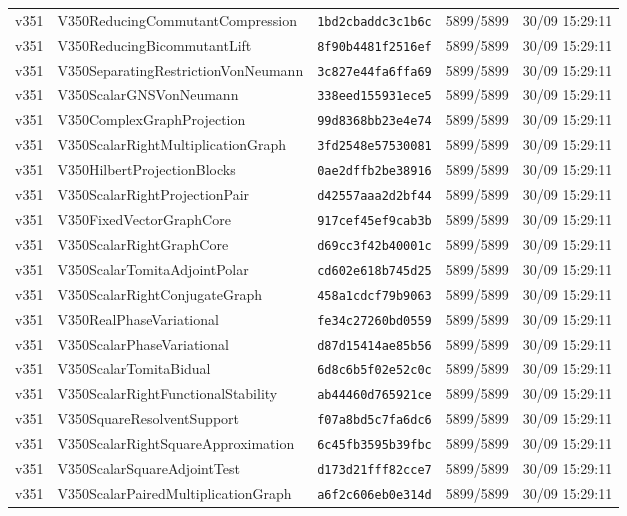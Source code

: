 \documentclass[11pt]{article}
\theoremstyle{definition}\newtheorem{deriv}{Derivation}
\begin{document}
{\begin{longtable}{@{}lllll@{}}
v351 & V350ReducingCommutantCompression & \texttt{1bd2cbaddc3c1b6c} & 5899/5899 & 30/09 15:29:11 \\
v351 & V350ReducingBicommutantLift & \texttt{8f90b4481f2516ef} & 5899/5899 & 30/09 15:29:11 \\
v351 & V350SeparatingRestrictionVonNeumann & \texttt{3c827e44fa6ffa69} & 5899/5899 & 30/09 15:29:11 \\
v351 & V350ScalarGNSVonNeumann & \texttt{338eed155931ece5} & 5899/5899 & 30/09 15:29:11 \\
v351 & V350ComplexGraphProjection & \texttt{99d8368bb23e4e74} & 5899/5899 & 30/09 15:29:11 \\
v351 & V350ScalarRightMultiplicationGraph & \texttt{3fd2548e57530081} & 5899/5899 & 30/09 15:29:11 \\
v351 & V350HilbertProjectionBlocks & \texttt{0ae2dffb2be38916} & 5899/5899 & 30/09 15:29:11 \\
v351 & V350ScalarRightProjectionPair & \texttt{d42557aaa2d2bf44} & 5899/5899 & 30/09 15:29:11 \\
v351 & V350FixedVectorGraphCore & \texttt{917cef45ef9cab3b} & 5899/5899 & 30/09 15:29:11 \\
v351 & V350ScalarRightGraphCore & \texttt{d69cc3f42b40001c} & 5899/5899 & 30/09 15:29:11 \\
v351 & V350ScalarTomitaAdjointPolar & \texttt{cd602e618b745d25} & 5899/5899 & 30/09 15:29:11 \\
v351 & V350ScalarRightConjugateGraph & \texttt{458a1cdcf79b9063} & 5899/5899 & 30/09 15:29:11 \\
v351 & V350RealPhaseVariational & \texttt{fe34c27260bd0559} & 5899/5899 & 30/09 15:29:11 \\
v351 & V350ScalarPhaseVariational & \texttt{d87d15414ae85b56} & 5899/5899 & 30/09 15:29:11 \\
v351 & V350ScalarTomitaBidual & \texttt{6d8c6b5f02e52c0c} & 5899/5899 & 30/09 15:29:11 \\
v351 & V350ScalarRightFunctionalStability & \texttt{ab44460d765921ce} & 5899/5899 & 30/09 15:29:11 \\
v351 & V350SquareResolventSupport & \texttt{f07a8bd5c7fa6dc6} & 5899/5899 & 30/09 15:29:11 \\
v351 & V350ScalarRightSquareApproximation & \texttt{6c45fb3595b39fbc} & 5899/5899 & 30/09 15:29:11 \\
v351 & V350ScalarSquareAdjointTest & \texttt{d173d21fff82cce7} & 5899/5899 & 30/09 15:29:11 \\
v351 & V350ScalarPairedMultiplicationGraph & \texttt{a6f2c606eb0e314d} & 5899/5899 & 30/09 15:29:11 \\

\end{longtable}}
\end{document}
